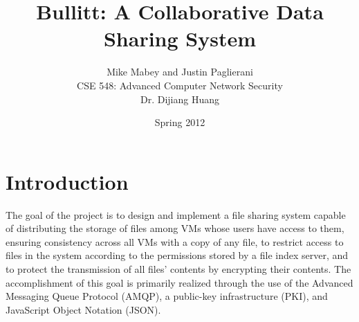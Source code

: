 \documentclass[12pt,letterpaper,onecolumn]{article}
\begin{document}
	
	
	
	\title{Bullitt: A Collaborative Data Sharing System}
	\author{Mike Mabey and Justin Paglierani\\
			CSE 548: Advanced Computer Network Security\\
			Dr. Dijiang Huang}
	\date{Spring 2012}
	\maketitle
	
	\section{Introduction}
	The goal of the project is to design and implement a file sharing system capable of distributing the storage of files among VMs whose users have access to them, ensuring consistency across all VMs with a copy of any file, to restrict access to files in the system according to the permissions stored by a file index server, and to protect the transmission of all files' contents by encrypting their contents.  The accomplishment of this goal is primarily realized through the use of the Advanced Messaging Queue Protocol (AMQP), a public-key infrastructure (PKI), and JavaScript Object Notation (JSON).
	

	
	
	
	
	
	
	
	
	
\end{document}
